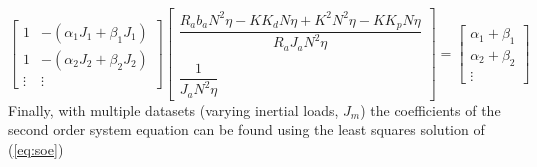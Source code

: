 \documentclass[12pt]{report}
\renewcommand\thesection{\arabic{section}}
\begin{document}
\begin{equation}
\begin{bmatrix}
  1 & -(\alpha_1J_1+\beta_1J_1) \\
  1 & -(\alpha_2J_2+\beta_2J_2) \\
  \vdots & \vdots
\end{bmatrix}
\begin{bmatrix}
  \dfrac{R_ab_aN^2\eta-KK_dN\eta+K^2N^2\eta-KK_pN\eta}{R_aJ_aN^2\eta} \\
  ~\\
  \dfrac{1}{J_aN^2\eta}
\end{bmatrix}
=
\begin{bmatrix}
  \alpha_1+\beta_1 \\
  \alpha_2+\beta_2 \\
  \vdots
\end{bmatrix}
\label{eq:soe}
\end{equation}
Finally, with multiple datasets (varying inertial loads, $J_m$) the coefficients of the second order system equation can be found using the least squares solution of (\ref{eq:soe})












% 
% 



% 
\end{document}
